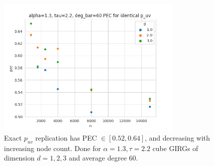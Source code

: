 \begin{figure}
  \includegraphics[width=0.8\textwidth]{./figures/pec_girg_identical_puv.png}
  \hfill
  \caption{Exact $p_{uv}$ replication has PEC $\in [0.52, 0.64]$, and decreasing with increasing node count. Done for $\alpha=1.3, \tau=2.2$ cube GIRGs of dimension $d=1,2,3$ and average degree $60$.}
  \label{fig:pec_girg_identical_puv}
\end{figure}






